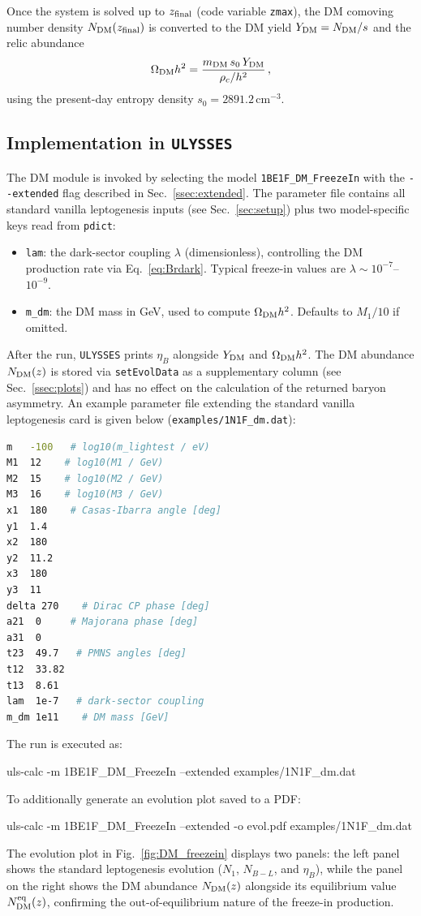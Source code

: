 \documentclass[12pt, a4paper]{article}
\begin{document}
Once the system is solved up to $z_{\rm final}$ (code variable \texttt{zmax}), the DM comoving number density $N_{\rm DM}(z_{\rm final})$ is converted to the DM yield $Y_{\rm DM} = N_{\rm DM}/s$ and the relic abundance
\begin{equation}
 \Omega_{\rm DM} h^2 = \frac{m_{\rm DM}\, s_0\, Y_{\rm DM}}{\rho_c/h^2}\,,
\end{equation}
using the present-day entropy density $s_0 = 2891.2\,\mathrm{cm}^{-3}$. 

\subsection{Implementation in \texttt{ULYSSES}}

The DM module is invoked by selecting the model \texttt{1BE1F\_DM\_FreezeIn} with the \texttt{-{}-extended} flag described in Sec.~\ref{ssec:extended}. The parameter file contains all standard vanilla leptogenesis inputs (see Sec.~\ref{sec:setup}) plus two model-specific keys read from \texttt{pdict}:
%
\begin{itemize}
 \item \texttt{lam}: the dark-sector coupling $\lambda$ (dimensionless), controlling the DM production rate via Eq.~\eqref{eq:Brdark}. Typical freeze-in values are $\lambda \sim 10^{-7}$--$10^{-9}$.
 \item \texttt{m\_dm}: the DM mass in GeV, used to compute $\Omega_{\rm DM} h^2$. Defaults to $M_1/10$ if omitted.
\end{itemize}
%
After the run, \texttt{ULYSSES} prints $\eta_B$ alongside $Y_{\rm DM}$ and $\Omega_{\rm DM} h^2$. The DM abundance $N_{\rm DM}(z)$ is stored via \texttt{setEvolData} as a supplementary column (see Sec.~\ref{ssec:plots}) and has no effect on the calculation of the returned baryon asymmetry.
An example parameter file extending the standard vanilla leptogenesis card is given below (\texttt{examples/1N1F\_dm.dat}):
%
\begin{lstlisting}[language = bash]
m   -100   # log10(m_lightest / eV)
M1  12    # log10(M1 / GeV)
M2  15    # log10(M2 / GeV)
M3  16    # log10(M3 / GeV)
x1  180    # Casas-Ibarra angle [deg]
y1  1.4
x2  180
y2  11.2
x3  180
y3  11
delta 270    # Dirac CP phase [deg]
a21  0     # Majorana phase [deg]
a31  0
t23  49.7   # PMNS angles [deg]
t12  33.82
t13  8.61
lam  1e-7   # dark-sector coupling
m_dm 1e11    # DM mass [GeV]
\end{lstlisting}
%
The run is executed as:
%
\begin{bash}
uls-calc -m 1BE1F_DM_FreezeIn --extended examples/1N1F_dm.dat
\end{bash}
%
To additionally generate an evolution plot saved to a PDF:
\begin{bash}
uls-calc -m 1BE1F_DM_FreezeIn --extended -o evol.pdf examples/1N1F_dm.dat
\end{bash}
%
%
 The evolution plot in Fig.~\ref{fig:DM_freezein} displays two panels: the left panel shows the standard leptogenesis evolution ($N_1$, $N_{B-L}$, and $\eta_B$), while the panel on the right shows the DM abundance $N_{\rm DM}(z)$ alongside its equilibrium value $N_{\rm DM}^{\rm eq}(z)$, confirming the out-of-equilibrium nature of the freeze-in production.
\end{document}

